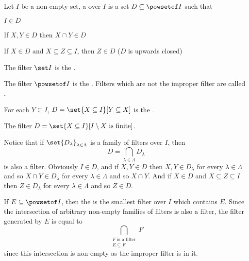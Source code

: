 \documentclass[10pt]{article}
\begin{document}


\bigskip

\begin{defn*}

    Let $I$ be a non-empty set, a  over $I$ is a set $D\subseteq\powsetof I$ such that
    \benum
        \item $I\in D$
        \item If $X,Y\in D$ then $X\cap Y\in D$
        \item If $X\in D$ and $X\subseteq Z\subseteq I$, then $Z\in D$ ($D$ is upwards closed)
    \eenum

\end{defn*}

\begin{exam*}

    \benum
        \item The filter $\set I$ is the .
        \item The filter $\powsetof I$ is the .
        Filters which are not the improper filter are called .
        \item For each $Y\subseteq I$, $D=\set{X\subseteq I}[Y\subseteq X]$ is the .
        \item The  filter $D=\set{X\subseteq I}[I\setminus X\text{ is finite}]$.
    \eenum

\end{exam*}

Notice that if $\set{D_\lambda}_{\lambda\in\Lambda}$ is a family of filters over $I$, then
\[ D = \bigcap_{\lambda\in\Lambda} D_\lambda \]
is also a filter.
Obviously $I\in D$, and if $X,Y\in D$ then $X,Y\in D_\lambda$ for every $\lambda\in\Lambda$ and so $X\cap Y\in D_\lambda$ for every $\lambda\in\Lambda$ and so $X\cap Y$.
And if $X\in D$ and $X\subseteq Z\subseteq I$ then $Z\in D_\lambda$ for every $\lambda\in\Lambda$ and so $Z\in D$.

\begin{defn*}

    If $E\subseteq\powsetof I$, then the  is the smallest filter over $I$ which contains $E$.
    Since the intersection of arbitrary non-empty families of filters is also a filter, the filter generated by $E$ is equal to
    \[ \bigcap_{\substack{F\text{ is a filter}\\E\subseteq F}} F \]
    since this intersection is non-empty as the improper filter is in it.

\end{defn*}
\end{document}
